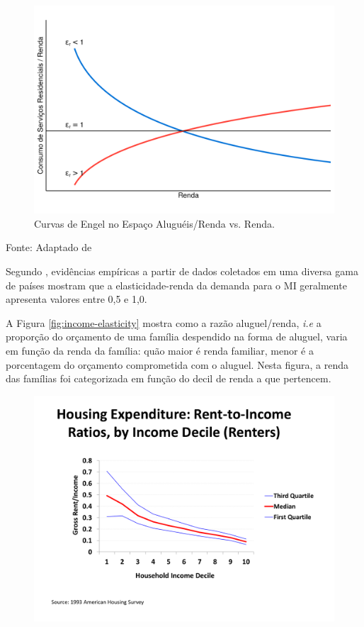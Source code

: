 \documentclass[
	12pt,				%
	oneside,			%
	a4paper,			%
	chapter=TITLE,		%
	section=TITLE,		%
	english,			%
	brazil				%
	]{abntex2}
\newcommand{\bcenter}{\begin{center}}
\newcommand{\ecenter}{\end{center}}
\begin{document}
\begin{refsection}
\begin{figure}[H]
{\centering \includegraphics[width=0.7\linewidth]{images/engel2-1} 

}

\caption{Curvas de Engel no Espaço Aluguéis/Renda vs. Renda.}\label{fig:engel2}
\end{figure}
\bcenter

\small Fonte: Adaptado de \textcite[p.~13]{regulation}
\ecenter

Segundo \textcite[p.~13]{regulation}, evidências empíricas a partir de dados coletados
em uma diversa gama de países mostram que a elasticidade-renda da demanda para o
\gls{MI} geralmente apresenta valores entre 0,5 e 1,0.

A Figura \ref{fig:income-elasticity} mostra como a razão aluguel/renda, \emph{i.e} a
proporção do orçamento de uma família despendido na forma de aluguel, varia em
função da renda da família: quão maior é renda familiar, menor é a porcentagem
do orçamento comprometida com o aluguel. Nesta figura, a renda das famílias foi
categorizada em função do decil de renda a que pertencem.
\begin{figure}[H]

{\centering \includegraphics[width=0.7\linewidth]{images/income_elasticity} 

}
\end{figure}
\end{refsection}
\end{document}
